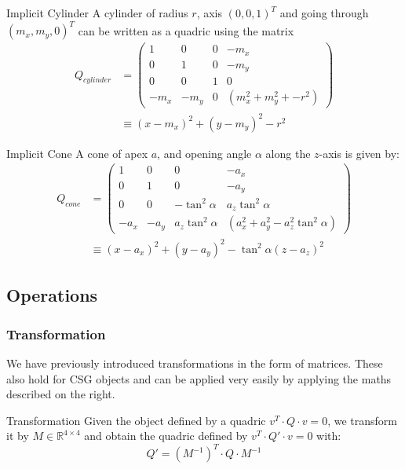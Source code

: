 \documentclass[english]{panikzettel}
\begin{document}
\begin{defi}{Implicit Cylinder}
A cylinder of radius $r$, axis $(0,0,1)^T$ and going through $(m_x,m_y,0)^T$ can be written as a quadric using the matrix
\begin{align*}Q_{cylinder} &=
\begin{pmatrix}
1 & 0 & 0 & -m_x \\
0 & 1 & 0 & -m_y \\
0 & 0 & 1 & 0 \\
-m_x & -m_y & 0 & (m_x^2 + m_y^2 + - r^2)
\end{pmatrix} \\
&\equiv (x-m_x)^2 + (y-m_y)^2 - r^2
\end{align*}
\end{defi}

\begin{defi}{Implicit Cone}
A cone of apex $a$, and opening angle $\alpha$ along the $z$-axis is given by:
\begin{align*}Q_{cone} &=
\begin{pmatrix}
1 & 0 & 0 & -a_x \\
0 & 1 & 0 & -a_y \\
0 & 0 & -\tan^2 \alpha & a_z \tan^2 \alpha \\
-a_x & -a_y & a_z \tan^2 \alpha & (a_x^2 + a_y^2 - a_z^2 \tan^2 \alpha)
\end{pmatrix} \\
&\equiv (x-a_x)^2 + (y-a_y)^2 - \tan^2 \alpha (z-a_z)^2
\end{align*}
\end{defi}

\begin{halfboxl}
\vspace{-\baselineskip}
\subsection{Operations}

\subsubsection*{Transformation}

We have previously introduced transformations in the form of matrices. These also hold for CSG objects and can be applied very easily by applying the maths described on the right.
\end{halfboxl}%
\begin{halfboxr}
\vspace{-\baselineskip}
\begin{defi}{Transformation}
Given the object defined by a quadric $v^T \cdot Q \cdot v = 0$, we transform it by $M \in \mathbb{R}^{4 \times 4}$ and obtain the quadric defined by $v^T \cdot Q' \cdot v = 0$ with:
$$Q' = (M^{-1})^T \cdot Q \cdot M^{-1}$$
\end{defi}
\end{halfboxr}
\end{document}
